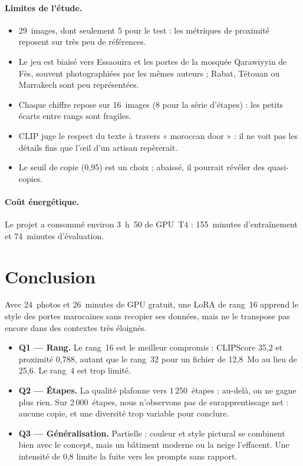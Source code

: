 \documentclass[11pt,a4paper]{article}
\begin{document}
\paragraph{Limites de l'étude.}
\begin{itemize}
  \item 29~images, dont seulement 5 pour le test : les métriques de proximité reposent sur très peu de références.
  \item Le jeu est biaisé vers Essaouira et les portes de la mosquée Qarawiyyin de Fès, souvent photographiées par les mêmes auteurs ; Rabat, Tétouan ou Marrakech sont peu représentées.
  \item Chaque chiffre repose sur 16~images (8 pour la série d'étapes) : les petits écarts entre rangs sont fragiles.
  \item CLIP juge le respect du texte à travers « moroccan door » : il ne voit pas les détails fins que l'œil d'un artisan repèrerait.
  \item Le seuil de copie (0,95) est un choix ; abaissé, il pourrait révéler des quasi-copies.
\end{itemize}

\paragraph{Coût énergétique.} Le projet a consommé environ 3~h~50 de GPU~T4 : 155~minutes d'entraînement et 74~minutes d'évaluation.

\section{Conclusion}

Avec 24~photos et 26~minutes de GPU gratuit, une LoRA de rang~16 apprend le style des portes marocaines sans recopier ses données, mais ne le transpose pas encore dans des contextes très éloignés.

\begin{itemize}
  \item \textbf{Q1 --- Rang.} Le rang~16 est le meilleur compromis : CLIPScore 35,2 et proximité 0,788, autant que le rang~32 pour un fichier de 12,8~Mo au lieu de 25,6. Le rang~4 est trop limité.
  \item \textbf{Q2 --- Étapes.} La qualité plafonne vers 1\,250~étapes ; au-delà, on ne gagne plus rien. Sur 2\,000~étapes, nous n'observons pas de surapprentissage net : aucune copie, et une diversité trop variable pour conclure.
  \item \textbf{Q3 --- Généralisation.} Partielle : couleur et style pictural se combinent bien avec le concept, mais un bâtiment moderne ou la neige l'effacent. Une intensité de 0,8 limite la fuite vers les prompts sans rapport.
\end{itemize}
\end{document}
